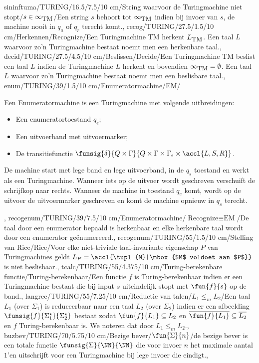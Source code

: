 sininftuma/TURING/16.5/7.5/10 cm/String waarvoor de Turingmachine niet stopt/$s\in\infty_{\mbox{\small TM}}$/{Een string $s$ behoort tot $\infty_{\mbox{\small TM}}$ indien bij invoer van $s$, de machine nooit in $q_a$ of $q_r$ terecht komt.},
recog/TURING/27.5/1.5/10 cm/Herkennen/Recognize/{Een Turingmachine TM herkent $L_{\mbox{\small TM}}$. Een taal $L$ waarvoor zo'n Turingmachine bestaat noemt men een herkenbare taal.},
decid/TURING/27.5/4.5/10 cm/Beslissen/Decide/{Een Turingmachine TM beslist een taal $L$ indien de Turingmachine $L$ herkent en bovendien $\infty_{\mbox{\small TM}}=\emptyset$. Een taal $L$ waarvoor zo'n Turingmachine bestaat noemt men een beslisbare taal.},
enum/TURING/39/1.5/10 cm/Enumeratormachine/EM/{Een Enumeratormachine is een Turingmachine met volgende uitbreidingen:\begin{itemize}
 \item Een enumeratortoestand $q_e$;
 \item Een uitvoerband met uitvoermarker;
 \item De transitiefunctie $\funsig{\delta}{Q\times\Gamma}{Q\times\Gamma\times\Gamma_{\epsilon}\times\accl{L,S,R}}$.
\end{itemize}De machine start met lege band en lege uitvoerband, in de $q_s$ toestand en werkt als een Turingmachine. Wanneer iets op de uitvoer wordt geschreven verschuift de schrijfkop naar rechts. Wanneer de machine in toestand $q_e$ komt, wordt op de uitvoer de uitvoermarker geschreven en komt de machine opnieuw in $q_s$ terecht.},
recogenum/TURING/39/7.5/10 cm/Enumeratormachine/$\mbox{Recognize}\equiv\mbox{EM}$/{De taal door een enumerator bepaald is herkenbaar en elke herkenbare taal wordt door een enumerator ge\"enumereerd.},
recogenum/TURING/55/1.5/10 cm/Stelling van Rice/Rice/{Voor elke niet-triviale taal-invariante eigenschap $P$ van Turingmachines geldt $L_{P}=\accl{\tupl{M}|\mbox{$M$ voldoet aan $P$}}$ is niet beslisbaar.},
tcalc/TURING/55/4.375/10 cm/Turing-berekenbare functie/Turing-berekenbaar/{Een functie $f$ is Turing-berekenbaar indien er een Turingmachine bestaat die bij input $s$ uiteindelijk stopt met $\fun{f}{s}$ op de band.},
langrec/TURING/55/7.25/10 cm/Reductie van talen/$L_1\leq_mL_2$/{Een taal $L_1$ (over $\Sigma_1$) is reduceerbaar naar een taal $L_2$ (over $\Sigma_2$) indien er een afbeelding $\funsig{f}{\Sigma_1^{\star}}{\Sigma_2^{\star}}$ bestaat zodat $\fun{f}{L_1}\subseteq L_2$ en $\overline{\fun{f}{L_1}}\subseteq\overline{L_2}$ en $f$ Turing-berekenbaar is. We noteren dat door $L_1\leq_mL_2$.},
buzbev/TURING/70/5.75/10 cm/Bezige bever/$\fun{\Sigma}{n}$/{de bezige bever is een totale functie $\funsig{\Sigma}{\NN}{\NN}$ die voor invoer $n$ het maximale aantal $1$'en uitschrijft voor een Turingmachine bij lege invoer die eindigt.},
